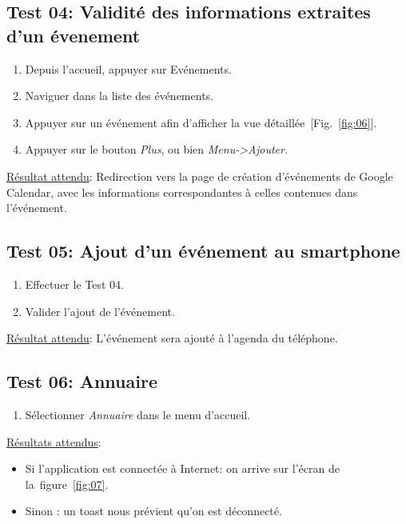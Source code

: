   \subsection*{Test 04: Validité des informations extraites d'un évenement}
    \begin{enumerate}
    \item Depuis l'accueil, appuyer sur Evénements.
    \item Naviguer dans la liste des événements.
    \item Appuyer sur un événement afin d'afficher la vue détaillée~[Fig.~\ref{fig:06}].
    \item Appuyer sur le bouton \emph{Plus}, ou bien \emph{Menu->Ajouter}.
    \end{enumerate}

    \underline{Résultat attendu}: Redirection vers la page de création d'événements de Google Calendar, avec les informations correspondantes à celles contenues dans l'événement.

  \subsection*{Test 05: Ajout d'un événement au smartphone}
    \begin{enumerate}
    \item Effectuer le Test 04.
    \item Valider l'ajout de l'événement.
    \end{enumerate}

    \underline{Résultat attendu}: L'événement sera ajouté à l'agenda du téléphone.


  \subsection*{Test 06: Annuaire}
    \begin{enumerate}
    \item Sélectionner \emph{Annuaire} dans le menu d'accueil.
    \end{enumerate}

    \underline{Résultats attendus}:
    \begin{itemize}
    \item Si l'application est connectée à Internet: on arrive sur l'écran de la~figure~\ref{fig:07}.
    \item Sinon : un toast nous prévient qu'on est déconnecté.
    \end{itemize}

